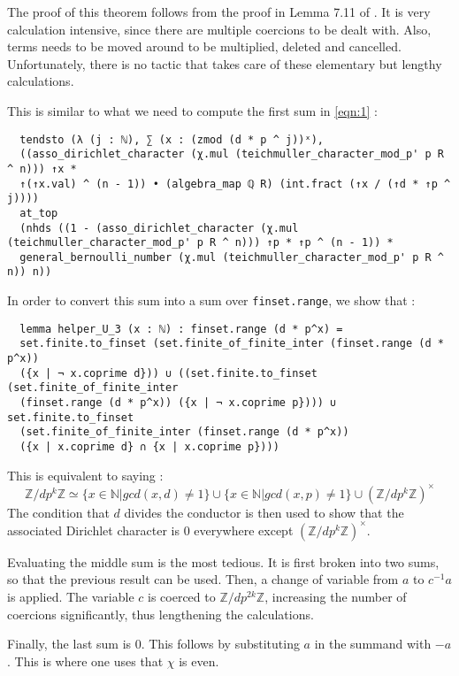 \documentclass[a4paper,UKenglish,cleveref, autoref, thm-restate]{lipics-v2021}
\newcommand{\lean}[1]{\texttt{#1}\xspace} %
\begin{document}
The proof of this theorem follows from the proof in Lemma 7.11 of \cite{cyc}. It is very calculation intensive, since there are multiple 
coercions to be dealt with. Also, terms needs to be moved around to be multiplied, deleted and cancelled. Unfortunately, there is no tactic 
that takes care of these elementary but lengthy calculations. 

This is similar to what we need to compute the first sum in \eqref{eqn:1} :
\begin{lstlisting}
  tendsto (λ (j : ℕ), ∑ (x : (zmod (d * p ^ j))ˣ),
  ((asso_dirichlet_character (χ.mul (teichmuller_character_mod_p' p R ^ n))) ↑x *
  ↑(↑x.val) ^ (n - 1)) • (algebra_map ℚ R) (int.fract (↑x / (↑d * ↑p ^ j))))
  at_top
  (nhds ((1 - (asso_dirichlet_character (χ.mul (teichmuller_character_mod_p' p R ^ n))) ↑p * ↑p ^ (n - 1)) *
  general_bernoulli_number (χ.mul (teichmuller_character_mod_p' p R ^ n)) n))
\end{lstlisting}

In order to convert this sum into a sum over \lean{finset.range}, we show that :
\begin{lstlisting}
  lemma helper_U_3 (x : ℕ) : finset.range (d * p^x) = 
  set.finite.to_finset (set.finite_of_finite_inter (finset.range (d * p^x)) 
  ({x | ¬ x.coprime d})) ∪ ((set.finite.to_finset (set.finite_of_finite_inter 
  (finset.range (d * p^x)) ({x | ¬ x.coprime p}))) ∪ set.finite.to_finset 
  (set.finite_of_finite_inter (finset.range (d * p^x)) 
  ({x | x.coprime d} ∩ {x | x.coprime p}))) 
\end{lstlisting}

This is equivalent to saying :
$$ \mathbb{Z} / d p^k \mathbb{Z} \simeq \{ x \in \mathbb{N} | gcd (x, d) \ne 1 \} \cup \{ x \in \mathbb{N} | gcd (x, p) \ne 1 \} 
\cup (\mathbb{Z} / d p^k \mathbb{Z})^{\times} $$
The condition that $d$ divides the conductor is then used to show that the associated Dirichlet character is 0 everywhere except 
$(\mathbb{Z} / d p^k \mathbb{Z})^{\times}$. 

Evaluating the middle sum is the most tedious. It is first broken into two sums, so that the previous result can be used. Then, a 
change of variable from $a$ to $c^{-1} a$ is applied. The variable $c$ is coerced to $\mathbb{Z}/ d p^{2k} \mathbb{Z}$, increasing 
the number of coercions significantly, thus lengthening the calculations. 

Finally, the last sum is 0. This follows by substituting $a$ in the summand with $-a$. This is where one uses that $\chi$ is even. 
\end{document}
